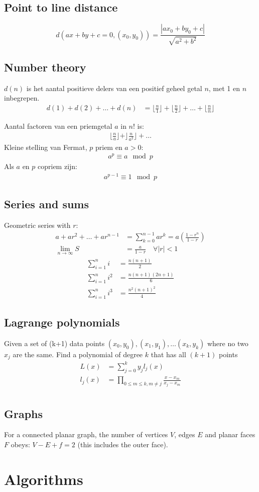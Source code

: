 \documentclass[a4paper, twocolumn]{article}
\begin{document}
\subsection*{Point to line distance}
\begin{equation*}
	d(ax+by+c=0, (x_0, y_0)) = \frac{|ax_0+by_0+c|}{\sqrt{a^2+b^2}}
\end{equation*}
\subsection*{Number theory}
$d(n)$ is het aantal positieve delers van een positief geheel getal $n$, met 1 en $n$ inbegrepen.
\begin{align*}
	d(1) + d(2) + \ldots + d(n) &= \lfloor \frac{n}{1} \rfloor + \lfloor \frac{n}{2} \rfloor + \ldots + \lfloor \frac{n}{n} \rfloor
\end{align*}

Aantal factoren van een priemgetal $a$ in $n!$ is:
\begin{align*}
	\lfloor \frac{n}{a} \rfloor + \rfloor \frac{n}{a^2} \rfloor + \ldots
\end{align*}
Kleine stelling van Fermat, $p$ priem en $a>0$:
\begin{align*}
	a^p \equiv a \mod p
\end{align*}
Als $a$ en $p$ copriem zijn:
\begin{align*}
	a^{p-1} \equiv 1 \mod p
\end{align*}
\subsection*{Series and sums}
Geometric series with $r$:
\begin{align*}
	a + ar^2 + \ldots + ar^{n-1} &= \sum^{n-1}_{k=0} ar^{k} = a\left(\frac{1-r^n}{1-r}\right) \\
	\lim_{n\rightarrow \infty} S &= \frac{a}{1-r} \quad \forall |r| < 1
\end{align*}
\begin{align*}
    \sum_{i=1}^n i &= \frac{n(n+1)}{2} \\
    \sum_{i=1}^n i^2 &= \frac{n(n+1)(2n+1)}{6} \\
    \sum_{i=1}^n i^3 &= \frac{n^2(n+1)^2}{4}
\end{align*}
\subsection{Lagrange polynomials}
Given a set of (k+1) data points $(x_0,y_0),(x_1,y_1), \ldots (x_k,y_k)$ where no two $x_j$ are the same. Find a polynomial of degree $k$ that has all $(k+1)$ points
\begin{align*}
L(x) &= \sum_{j=0}^k y_jl_j(x) \\
l_j(x) &= \prod_{0 \leq m \leq k, m \neq j} \frac{x-x_m}{x_j-x_m} \\
\end{align*}

\subsection*{Graphs}
For a connected planar graph, the number of vertices $V$, edges $E$ and planar faces $F$ obeys: $V-E+f=2$ (this includes the outer face).

\section{Algorithms}

\end{document}
